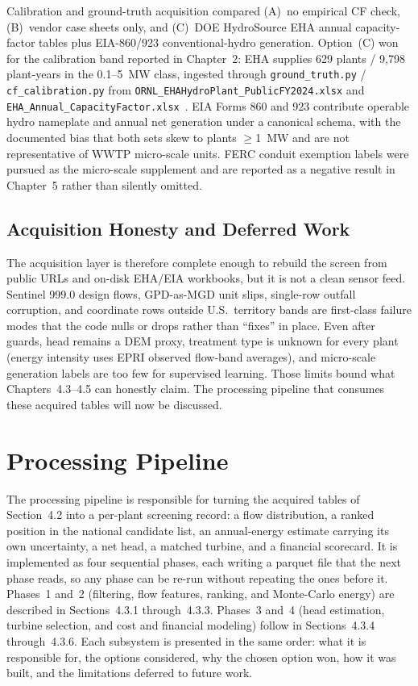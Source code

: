 \documentclass[12pt,letterpaper]{report}
\begin{document}
Calibration and ground-truth acquisition compared (A)~no empirical CF check,
(B)~vendor case sheets only, and (C)~DOE HydroSource EHA annual capacity-factor
tables plus EIA-860/923 conventional-hydro generation. Option~(C) won for the
calibration band reported in Chapter~2: EHA supplies 629 plants /
9{,}798 plant-years in the 0.1--5~MW class, ingested through
\texttt{ground\_truth.py} / \texttt{cf\_calibration.py} from
\texttt{ORNL\_\allowbreak EHAHydroPlant\_\allowbreak PublicFY2024.xlsx} and
\texttt{EHA\_\allowbreak Annual\_\allowbreak CapacityFactor.xlsx}~\cite{hydrosource_eha}. EIA Forms 860
and 923 contribute operable hydro nameplate and annual net generation under a
canonical schema, with the documented bias that both sets skew to plants
$\geq$1~MW and are not representative of WWTP micro-scale units. FERC conduit
exemption labels were pursued as the micro-scale supplement and are reported as a
negative result in Chapter~5 rather than silently omitted.

\subsection{Acquisition Honesty and Deferred Work}

The acquisition layer is therefore complete enough to rebuild the screen from
public URLs and on-disk EHA/EIA workbooks, but it is not a clean sensor feed.
Sentinel 999.0 design flows, GPD-as-MGD unit slips, single-row outfall corruption,
and coordinate rows outside U.S.\ territory bands are first-class failure modes
that the code nulls or drops rather than ``fixes'' in place. Even after guards,
head remains a DEM proxy, treatment type is unknown for every plant (energy
intensity uses EPRI observed flow-band averages), and micro-scale generation labels
are too few for supervised learning. Those limits bound what Chapters~4.3--4.5 can
honestly claim. The processing pipeline that consumes these acquired tables will
now be discussed.

\section{Processing Pipeline}                            %

The processing pipeline is responsible for turning the acquired tables of
Section~4.2 into a per-plant screening record: a flow distribution, a ranked
position in the national candidate list, an annual-energy estimate carrying its
own uncertainty, a net head, a matched turbine, and a financial scorecard. It is
implemented as four sequential phases, each writing a parquet file that the next
phase reads, so any phase can be re-run without repeating the ones before it.
Phases~1 and~2 (filtering, flow features, ranking, and Monte-Carlo energy)
are described in Sections~4.3.1 through~4.3.3. Phases~3 and~4 (head
estimation, turbine selection, and cost and financial modeling) follow in
Sections~4.3.4 through~4.3.6. Each subsystem is presented in the same order:
what it is responsible for, the options considered, why the chosen option won,
how it was built, and the limitations deferred to future work.
\end{document}
